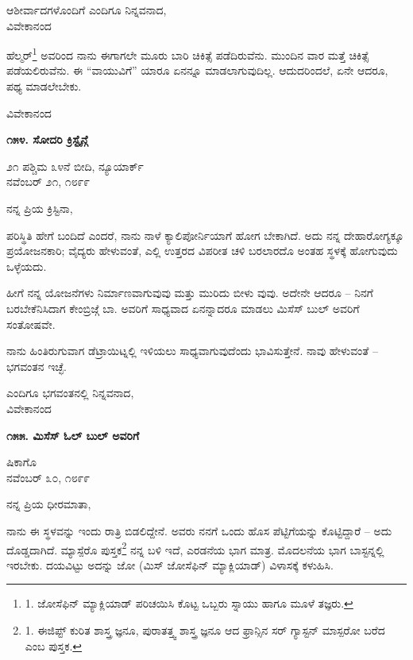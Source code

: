\begin{flushright}
ಆಶೀರ್ವಾದಗಳೊಂದಿಗೆ ಎಂದಿಗೂ ನಿನ್ನವನಾದ,\\ವಿವೇಕಾನಂದ
\end{flushright}

ಹೆಲ್ಮರ್\footnote{1. ಜೋಸೆಫಿನ್ ಮ್ಯಾಕ್ಲಿಯಾಡ್ ಪರಿಚಯಿಸಿ ಕೊಟ್ಟ ಒಬ್ಬರು ಸ್ನಾಯು ಹಾಗೂ ಮೂಳೆ ತಜ್ಞರು.} ಅವರಿಂದ ನಾನು ಈಗಾಗಲೇ ಮೂರು ಬಾರಿ ಚಿಕಿತ್ಸೆ ಪಡೆದಿರುವೆನು. ಮುಂದಿನ ವಾರ ಮತ್ತೆ ಚಿಕಿತ್ಸೆ ಪಡೆಯಲಿರುವೆನು. ಈ “ವಾಯುವಿಗೆ” ಯಾರೂ ಏನನ್ನೂ ಮಾಡಲಾಗುವುದಿಲ್ಲ. ಆದುದರಿಂದಲೆ, ಏನೇ ಆದರೂ, ಪಥ್ಯ ಮಾಡಲೇಬೇಕು.

\begin{flushright}
ವಿವೇಕಾನಂದ
\end{flushright}

\begin{center}
\textbf{೧೫೪. ಸೋದರಿ ಕ್ರಿಸ್ಟೈನ್ಗೆ}
\end{center}

\begin{flushright}
೨೧ ಪಶ್ಚಿಮ ೩೪ನೆ ಬೀದಿ, ನ್ಯೂಯಾರ್ಕ್\\ನವೆಂಬರ್ ೨೧, ೧೮೯೯
\end{flushright}

ನನ್ನ ಪ್ರಿಯ ಕ್ರಿಸ್ಟಿನಾ,

ಪರಿಸ್ಥಿತಿ ಹೇಗೆ ಬಂದಿದೆ ಎಂದರೆ, ನಾನು ನಾಳೆ ಕ್ಯಾಲಿಪೋರ್ನಿಯಾಗೆ ಹೋಗ ಬೇಕಾಗಿದೆ. ಅದು ನನ್ನ ದೇಹಾರೋಗ್ಯಕ್ಕೂ ಪ್ರಯೋಜನಕಾರಿ; ವೈದ್ಯರು ಹೇಳುವಂತೆ, ಎಲ್ಲಿ ಉತ್ತರದ ವಿಪರೀತ ಚಳಿ ಬರಲಾರದೊ ಅಂತಹ ಸ್ಥಳಕ್ಕೆ ಹೋಗುವುದು ಒಳ್ಳೆಯದು.

ಹೀಗೆ ನನ್ನ ಯೋಜನೆಗಳು ನಿರ್ಮಾಣವಾಗುವುವು ಮತ್ತು ಮುರಿದು ಬೀಳು ವುವು. ಅದೇನೇ ಆದರೂ – ನಿನಗೆ ಬರಬೇಕೆನಿಸಿದಾಗ ಕೇಂಬ್ರಿಜ್ಗೆ ಬಾ. ಅವರಿಗೆ ಸಾಧ್ಯವಾದ ಏನನ್ನಾದರೂ ಮಾಡಲು ಮಿಸೆಸ್ ಬುಲ್ ಅವರಿಗೆ ಸಂತೋಷವೇ.

ನಾನು ಹಿಂತಿರುಗುವಾಗ ಡೆಟ್ರಾಯಿಟ್ನಲ್ಲಿ ಇಳಿಯಲು ಸಾಧ್ಯವಾಗುವುದೆಂದು ಭಾವಿಸುತ್ತೇನೆ. ನಾವು ಹೇಳುವಂತೆ – ಭಗವಂತನ ಇಚ್ಛೆ.

\begin{flushright}
ಎಂದಿಗೂ ಭಗವಂತನಲ್ಲಿ ನಿನ್ನವನಾದ,\\ವಿವೇಕಾನಂದ
\end{flushright}

\begin{center}
\textbf{೧೫೫. ಮಿಸೆಸ್ ಓಲ್ ಬುಲ್ ಅವರಿಗೆ}
\end{center}

\begin{flushright}
ಷಿಕಾಗೊ\\ನವೆಂಬರ್ ೩೦, ೧೮೯೯
\end{flushright}

ನನ್ನ ಪ್ರಿಯ ಧೀರಮಾತಾ,

ನಾನು ಈ ಸ್ಥಳವನ್ನು ಇಂದು ರಾತ್ರಿ ಬಿಡಲಿದ್ದೇನೆ. ಅವರು ನನಗೆ ಒಂದು ಹೊಸ ಪೆಟ್ಟಿಗೆಯನ್ನು ಕೊಟ್ಟಿದ್ದಾರೆ – ಅದು ದೊಡ್ಡದಾಗಿದೆ. ಮ್ಯಾಸ್ಪೆರೊ ಪುಸ್ತಕ\footnote{1. ಈಜಿಪ್ಟ್ ಕುರಿತ ಶಾಸ್ತ್ರ ಜ್ಞನೂ, ಪುರಾತತ್ತ್ವ ಶಾಸ್ತ್ರ ಜ್ಞನೂ ಆದ ಫ್ರಾನ್ಸಿನ ಸರ್ ಗ್ಯಾಸ್ಟನ್ ಮಾಸ್ಪರೋ ಬರೆದ  ಎಂಬ ಪುಸ್ತಕ.} ನನ್ನ ಬಳಿ ಇದೆ, ಎರಡನೆಯ ಭಾಗ ಮಾತ್ರ. ಮೊದಲನೆಯ ಭಾಗ ಬಾಸ್ಟನ್ನಲ್ಲಿ ಇರಬೇಕು. ದಯವಿಟ್ಟು ಅದನ್ನು ಜೋ (ಮಿಸ್ ಜೋಸೆಫಿನ್ ಮ್ಯಾಕ್ಲಿಯಾಡ್) ವಿಳಾಸಕ್ಕೆ ಕಳುಹಿಸಿ.

